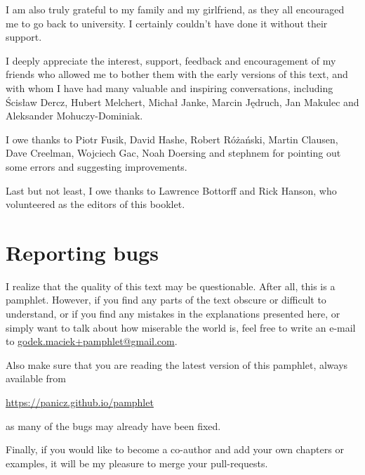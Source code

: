 I am also truly grateful to my family and my girlfriend,
as they all encouraged me to go back to university. I certainly
couldn't have done it without their support.

I deeply appreciate the interest, support, feedback and
encouragement of my friends who allowed me to bother them with
the early versions of this text, and with whom I have had many
valuable and inspiring conversations, including Ścisław Dercz,
Hubert Melchert, Michał Janke, Marcin Jędruch, Jan Makulec
and Aleksander Mohuczy-Dominiak. 

I owe thanks to Piotr Fusik, David Hashe, Robert Różański, Martin Clausen,
Dave Creelman, Wojciech Gac, Noah Doersing and stephnem for pointing
out some errors and suggesting improvements.

Last but not least, I owe thanks to Lawrence Bottorff and Rick Hanson,
who volunteered as the editors of this booklet.

\section*{Reporting bugs}

I realize that the quality of this text may be questionable.
After all, this is a pamphlet. However, if you find any parts
of the text obscure or difficult to understand, or if you
find any mistakes in the explanations presented here, or
simply want to talk about how miserable the world is, feel
free to write an e-mail to
\href{mailto:godek.maciek+pamphlet@gmail.com}{godek.maciek+pamphlet@gmail.com}.

Also make sure that you are reading the latest version
of this pamphlet, always available from

\url{https://panicz.github.io/pamphlet}

\noindent as many of the bugs may already have been fixed.

Finally, if you would like to become a co-author and add your
own chapters or examples, it will be my pleasure to merge your
pull-requests.
